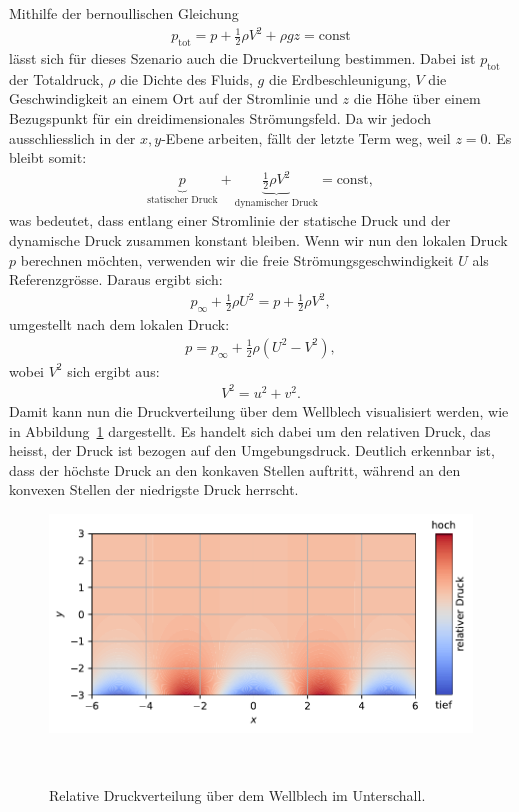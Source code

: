 Mithilfe der bernoullischen Gleichung~\cite{BernoulliWikiDE}
\begin{align*}
    p_{\text{tot}} 
    = 
    p 
    + 
    \frac{1}{2} \rho V^2 
    + 
    \rho g z 
    = \text{const}
\end{align*}
lässt sich für dieses Szenario auch die Druckverteilung bestimmen.
Dabei ist $p_{\text{tot}}$ der Totaldruck, 
$\rho$ die Dichte des Fluids, $g$ die Erdbeschleunigung,
$V$ die Geschwindigkeit an einem Ort auf der Stromlinie 
und $z$ die Höhe über einem Bezugspunkt 
für ein dreidimensionales Strömungsfeld.
Da wir jedoch ausschliesslich in der $x,y$-Ebene arbeiten, 
fällt der letzte Term weg, weil $z = 0$.
Es bleibt somit:
\begin{align*}
    \underbrace{p}_{\text{statischer Druck}} 
    + 
    \underbrace{\frac{1}{2} \rho V^2}_{\text{dynamischer Druck}} 
    = 
    \text{const},
\end{align*}
was bedeutet, dass entlang einer Stromlinie 
der statische Druck und der dynamische Druck
zusammen konstant bleiben.
Wenn wir nun den lokalen Druck $p$ berechnen möchten, 
verwenden wir die freie Strömungsgeschwindigkeit $U$
als Referenzgrösse. 
Daraus ergibt sich:
\begin{align*}
    p_\infty 
    + 
    \frac{1}{2} \rho U^2 
    = 
    p 
    + 
    \frac{1}{2} \rho V^2,
\end{align*}
umgestellt nach dem lokalen Druck:
\begin{align*}
    p = p_\infty + \frac{1}{2} \rho (U^2 - V^2),
\end{align*}
wobei $V^2$ sich ergibt aus:
\begin{align*}
    V^2 = u^2 + v^2.
\end{align*}
Damit kann nun die Druckverteilung über dem Wellblech visualisiert werden, 
wie in Abbildung~\ref{fig:druckverteilung} dargestellt. 
Es handelt sich dabei um den relativen Druck, 
das heisst, der Druck ist bezogen auf den Umgebungsdruck. 
Deutlich erkennbar ist, dass der höchste Druck an den konkaven Stellen auftritt, 
während an den konvexen Stellen der niedrigste Druck herrscht.
\begin{figure}
    \centering
    \includegraphics[width=\textwidth]{papers/ueberschall/figures/Druckverteilung.pdf}
    \caption{Relative Druckverteilung über dem Wellblech im Unterschall.}
    ~\label{fig:druckverteilung}  
\end{figure}

